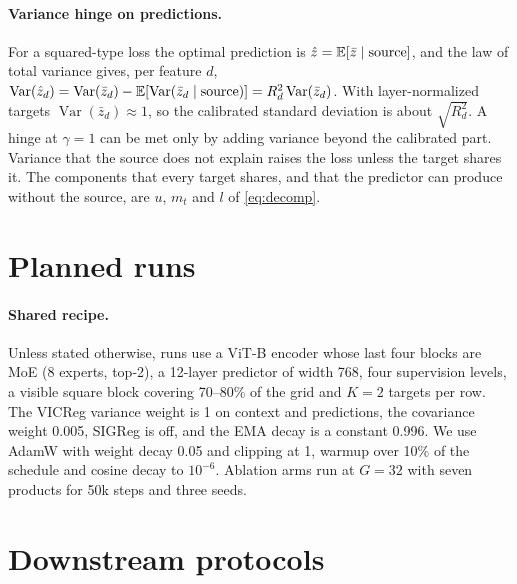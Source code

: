 \paragraph{Variance hinge on predictions.} For a squared-type loss the optimal prediction is $\hat z = \operatorname*{\mathbb{E}}[\bar z \mid \text{source}]$, and the law of total variance gives, per feature $d$, $\operatorname{Var}(\hat z_d) = \operatorname{Var}(\bar z_d) - \operatorname*{\mathbb{E}}[\operatorname{Var}(\bar z_d \mid \text{source})] = R_d^2 \operatorname{Var}(\bar z_d)$. With layer-normalized targets $\operatorname{Var}(\bar z_d)\approx 1$, so the calibrated standard deviation is about $\sqrt{R_d^2}$. A hinge at $\gamma{=}1$ can be met only by adding variance beyond the calibrated part. Variance that the source does not explain raises the loss unless the target shares it. The components that every target shares, and that the predictor can produce without the source, are $u$, $m_t$ and $l$ of \cref{eq:decomp}.

\section{Planned runs}
\label{sec:supp_runs}

\paragraph{Shared recipe.} Unless stated otherwise, runs use a ViT-B encoder whose last four blocks are MoE (8 experts, top-2), a 12-layer predictor of width 768, four supervision levels, a visible square block covering 70--80\% of the grid and $K{=}2$ targets per row. The VICReg variance weight is 1 on context and predictions, the covariance weight 0.005, SIGReg is off, and the EMA decay is a constant 0.996. We use AdamW with weight decay 0.05 and clipping at 1, warmup over 10\% of the schedule and cosine decay to $10^{-6}$. Ablation arms run at $G{=}32$ with seven products for 50k steps and three seeds. 

\section{Downstream protocols}
\label{sec:supp_downstream}

